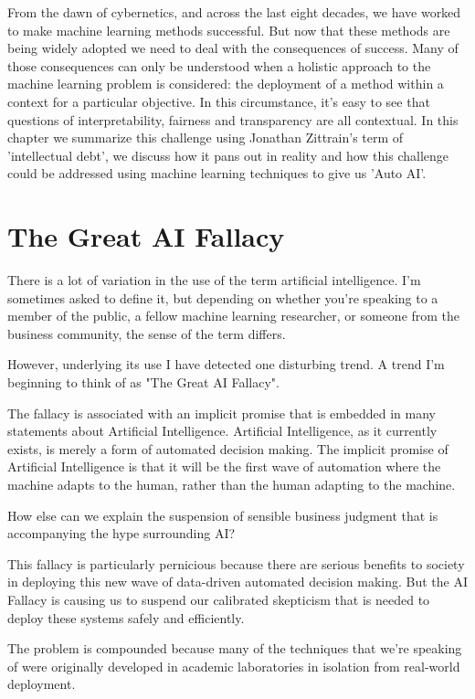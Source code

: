 \documentclass[a4paper]{caesar_book}
\begin{document}
From the dawn of cybernetics, and across the last eight decades, we have worked to make machine learning methods successful. But now that these methods are being widely adopted we need to deal with the consequences of success. Many of those consequences can only be understood when a holistic approach to the machine learning problem is considered: the deployment of a method within a context for a particular objective. In this circumstance, it’s easy to see that questions of interpretability, fairness and transparency are all contextual. In this chapter we summarize this challenge using Jonathan Zittrain’s term of 'intellectual debt', we discuss how it pans out in reality and how this challenge could be addressed using machine learning techniques to give us 'Auto AI'.

\section{The Great AI Fallacy}

There is a lot of variation in the use of the term artificial intelligence. I’m sometimes asked to define it, but depending on whether you’re speaking to a member of the public, a fellow machine learning researcher, or someone from the business community, the sense of the term differs.

However, underlying its use I have detected one disturbing trend. A trend I’m beginning to think of as "The Great AI Fallacy".

The fallacy is associated with an implicit promise that is embedded in many statements about Artificial Intelligence. Artificial Intelligence, as it currently exists, is merely a form of automated decision making. The implicit promise of Artificial Intelligence is that it will be the first wave of automation where the machine adapts to the human, rather than the human adapting to the machine.

How else can we explain the suspension of sensible business judgment that is accompanying the hype surrounding AI?

This fallacy is particularly pernicious because there are serious benefits to society in deploying this new wave of data-driven automated decision making. But the AI Fallacy is causing us to suspend our calibrated skepticism that is needed to deploy these systems safely and efficiently.

The problem is compounded because many of the techniques that we’re speaking of were originally developed in academic laboratories in isolation from real-world deployment.
\end{document}
